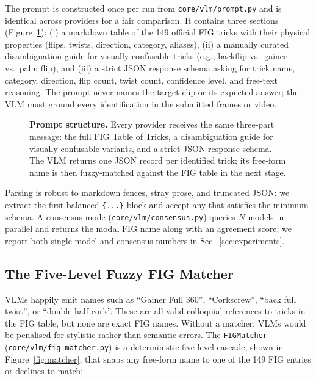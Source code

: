 The prompt is constructed once per run from
\texttt{core/vlm/prompt.py} and is identical across providers for a fair
comparison. It contains three sections (Figure~\ref{fig:prompt}): (i) a
markdown table of the 149 official FIG tricks with their physical
properties (flips, twists, direction, category, aliases), (ii) a manually
curated disambiguation guide for visually confusable tricks (e.g., backflip
vs.\ gainer vs.\ palm flip), and (iii) a strict JSON response schema asking
for trick name, category, direction, flip count, twist count, confidence
level, and free-text reasoning. The prompt never names the target clip or
its expected answer; the VLM must ground every identification in the
submitted frames or video.

\begin{figure}[t]
  \centering
  
  \caption{\textbf{Prompt structure.} Every provider receives the same
  three-part message: the full FIG Table of Tricks, a disambiguation guide
  for visually confusable variants, and a strict JSON response schema. The
  VLM returns one JSON record per identified trick; its free-form name is
  then fuzzy-matched against the FIG table in the next stage.}
  \label{fig:prompt}
\end{figure}

Parsing is robust to markdown fences, stray prose, and truncated JSON: we
extract the first balanced \texttt{\{...\}} block and accept any that
satisfies the minimum schema. A consensus mode
(\texttt{core/vlm/consensus.py}) queries $N$ models in parallel and returns
the modal FIG name along with an agreement score; we report both
single-model and consensus numbers in Sec.~\ref{sec:experiments}.

\subsection{The Five-Level Fuzzy FIG Matcher}
\label{sec:system:matcher}

VLMs happily emit names such as ``Gainer Full 360'', ``Corkscrew'', ``back
full twist'', or ``double half cork''. These are all valid colloquial
references to tricks in the FIG table, but none are exact FIG names.
Without a matcher, VLMs would be penalised for stylistic rather than
semantic errors. The \texttt{FIGMatcher} (\texttt{core/vlm/fig\_matcher.py})
is a deterministic five-level cascade, shown in Figure~\ref{fig:matcher},
that snaps any free-form name to one of the 149 FIG entries or declines to
match:

